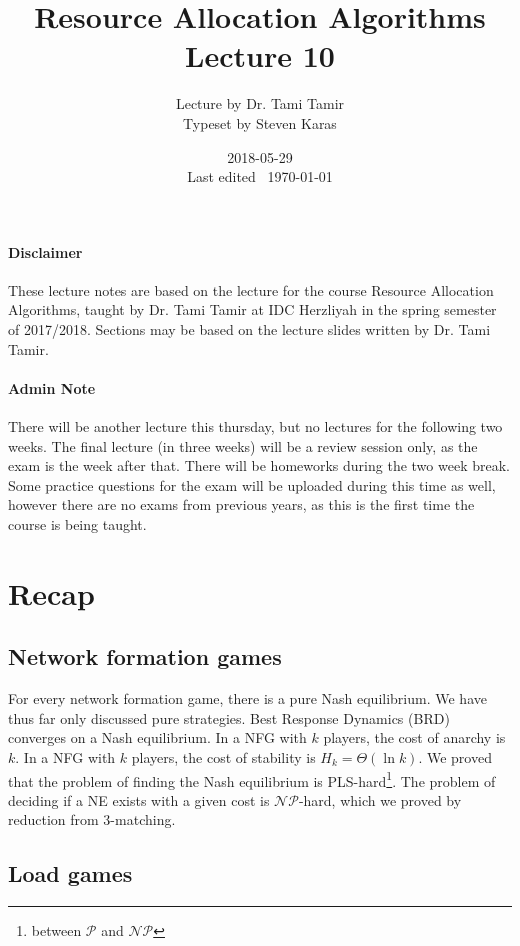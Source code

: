 \documentclass{idc_msc}
\title{Resource Allocation Algorithms\\\large Lecture 10}
\date{2018-05-29 \\ Last edited \currenttime\ \today}
\author{Lecture by Dr. Tami Tamir\\Typeset by Steven Karas}
\newcommand{\NPclass}{\mathcal{NP}}
\newcommand{\Pclass}{\mathcal{P}}
\begin{document}
\maketitle

\nocite{pinedo2016scheduling}

\paragraph{Disclaimer}

These lecture notes are based on the lecture for the course Resource Allocation Algorithms, taught by Dr. Tami Tamir at IDC Herzliyah in the spring semester of 2017/2018.
Sections may be based on the lecture slides written by Dr. Tami Tamir.

\paragraph{Admin Note}

There will be another lecture this thursday, but no lectures for the following two weeks.
The final lecture (in three weeks) will be a review session only, as the exam is the week after that.
There will be homeworks during the two week break.
Some practice questions for the exam will be uploaded during this time as well, however there are no exams from previous years, as this is the first time the course is being taught.

\section{Recap}

\subsection{Network formation games}

For every network formation game, there is a pure Nash equilibrium.
We have thus far only discussed pure strategies.
Best Response Dynamics (BRD) converges on a Nash equilibrium.
In a NFG with \(k\) players, the cost of anarchy is \(k\).
In a NFG with \(k\) players, the cost of stability is \(H_k = \Theta(\ln k)\).
We proved that the problem of finding the Nash equilibrium is PLS-hard\footnote{between \(\Pclass\) and \(\NPclass\)}.
The problem of deciding if a NE exists with a given cost is \(\NPclass\)-hard, which we proved by reduction from 3-matching.

\subsection{Load games}
\end{document}

